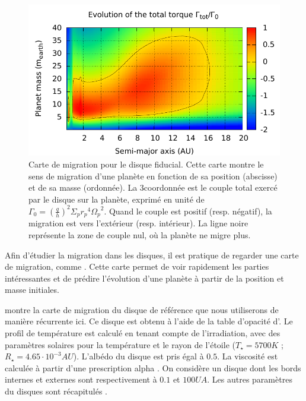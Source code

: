 \begin{figure}[htb]
\centering
\includegraphics[width=\linewidth]{figure/migration_map/fiducial.pdf}

\caption{Carte de migration pour le disque fiducial. Cette carte montre le sens de migration d'une planète en fonction de sa position (abscisse) et de sa masse (ordonnée). La 3\ieme coordonnée est le couple total exercé par le disque sur la planète, exprimé en unité de $\Gamma_0 = \left(\frac{q}{h}\right)^2\Sigma_p {r_p}^4 {\Omega_p}^2$. Quand le couple est positif (resp. négatif), la migration est vers l'extérieur (resp. intérieur). La ligne noire représente la zone de couple nul, où la planète ne migre plus. }\label{fig:fiducial_migration_map}
\end{figure}

Afin d'étudier la migration dans les disques, il est pratique de regarder une \og carte de migration\fg, comme . Cette carte permet de voir rapidement les parties intéressantes et de prédire l'évolution d'une planète à partir de la position et masse initiales.

 montre la carte de migration du disque de référence que nous utiliserons de manière récurrente ici. Ce disque est obtenu à l'aide de la table d'opacité d'\cite{hure2000transition}. Le profil de température est calculé en tenant compte de l'irradiation, avec des paramètres solaires pour la température et le rayon de l'étoile ($T_\star = 5700\unit{K}$ ; $R_\star = 4.65\cdot 10^{-3}\unit{AU}$). L'albédo du disque est pris égal à $0.5$. La viscosité est calculée à partir d'une prescription alpha \citep{shakura1973black}. On considère un disque dont les bords internes et externes sont respectivement à $0.1$ et $100\unit{UA}$. Les autres paramètres du disques sont récapitulés . 

